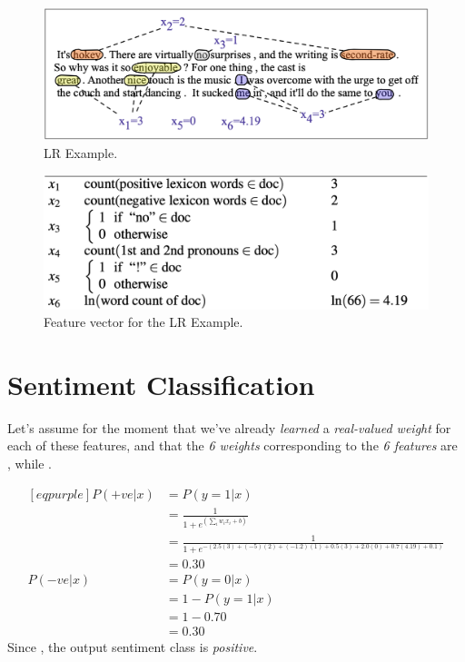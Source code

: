\documentclass[
	number={4},
	title={Logistic Regression}
]{cs584notes}
\begin{document}
\begin{figure}[H]
	\centering
	\includegraphics[width=\textwidth]{figures/4/lr_example}
	\caption{LR Example.}
	\label{fig:lr_example}
\end{figure}

\begin{figure}[H]
	\centering
	\includegraphics[width=\textwidth]{figures/4/lr_feature_vector}
	\caption{Feature vector for the LR Example.}
	\label{fig:lr_feature_vector}
\end{figure}


\section{Sentiment Classification}\label{sec:sentiment-classification}
Let's assume for the moment that we've already \emph{learned} a \emph{real-valued weight} for each of these features, and that the \emph{6 weights} corresponding to the \emph{6 features} are \data{$[2.5, -5.0, -1.2, 0.5, 2.0, 0.7]$}, while .

\begin{equation*}
\begin{aligned}[eqpurple]
	P(+ve | x) &= P(y = 1 | x)\\
	&= \frac{1}{1 + e^{\left( \sum_{i} w_{i}x_{i} + b \right)}}\\
	&= \frac{1}{1 + e^{-\left( 2.5(3) + (-5)(2) + (-1.2)(1) + 0.5(3) + 2.0(0) + 0.7(4.19) + 0.1 \right)}}\\
	&= 0.30\\
	P(-ve | x) &= P(y = 0 | x)\\
	&= 1 - P(y = 1 | x)\\
	&= 1 - 0.70\\
	&= 0.30
\end{aligned}
\end{equation*}
Since , the output sentiment class is \emph{positive}.
\end{document}
